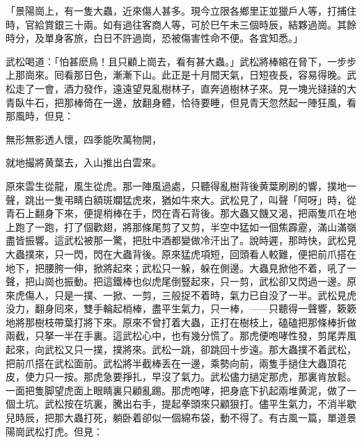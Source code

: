 \begin{myquote}[\markfont]
「景陽崗上，有一隻大蟲，近來傷人甚多。現今立限各鄉里正並獵戶人等，打捕住時，官給賞銀三十兩。如有過往客商人等，可於巳午未三個時辰，結夥過崗。其餘時分，及單身客旅，白日不許過崗，恐被傷害性命不便。各宜知悉。」
\end{myquote}

武松喝道：「怕甚麽鳥！且只顧上崗去，看有甚大蟲。」武松將棒綰在脅下，一步步上那崗來。囘看那日色，漸漸下山。此正是十月間天氣，日短夜長，容易得晚。武松走了一會，酒力發作，遠遠望見亂樹林子，直奔過樹林子來。見一塊光撻撻的大青臥牛石，把那棒倚在一邊，放翻身體，恰待要睡，但見青天忽然起一陣狂風，看那風時，但見：

\begin{myquote}
無形無影透人懷，四季能吹萬物開，

就地撮將黄葉去，入山推出白雲來。
\end{myquote}

原來雲生從龍，風生從虎。那一陣風過處，只聽得亂樹背後黄葉刷刷的響，撲地一聲，跳出一隻弔睛白額斑斕猛虎來，猶如牛來大。武松見了，叫聲「阿呀」時，從青石上翻身下來，便提梢棒在手，閃在青石背後。那大蟲又饑又渴，把兩隻爪在地上跑了一跑，打了個歡翅，將那條尾剪了又剪，半空中猛如一個焦霹靂，滿山滿嶺盡皆振響。這武松被那一驚，把肚中酒都變做冷汗出了。說時遲，那時快，武松見大蟲撲來，只一閃，閃在大蟲背後。原來猛虎項短，回頭看人較難，便把前爪搭在地下，把腰胯一伸，掀將起來；武松只一躲，躲在側邊。大蟲見掀他不着，吼了一聲，把山崗也振動。把這鐵棒也似虎尾倒豎起來，只一剪，武松卻又閃過一邊。原來虎傷人，只是一撲、一掀、一剪，三般捉不着時，氣力已自没了一半。武松見虎没力，翻身囘來，雙手輪起梢棒，盡平生氣力，只一棒，——只聽得一聲響，簌簌地將那樹枝帶葉打將下來。原來不曾打着大蟲，正打在樹枝上，磕磕把那條棒折做兩截，只拏一半在手裏。這武松心中，也有幾分慌了。那虎便咆哮性發，剪尾弄風起來，向武松又只一撲，撲將來。武松一跳，卻跳回十步遠。那大蟲撲不着武松，把前爪搭在武松面前。武松將半截棒丢在一邊，乘勢向前，兩隻手撾住大蟲頂花皮，使力只一按。那虎急要掙扎，早沒了氣力。武松儘力撾定那虎，那裏肯放鬆。一面把隻脚望虎面上眼睛裏只顧亂踢。那虎咆哮，把身底下扒起兩堆黄泥，做了一個土坑。武松按在坑裏，騰出右手，提起拳頭來只顧狠打。儘平生氣力，不消半歇兒時辰，把那大蟲打死，躺卧着卻似一個綿布袋，動不得了。有古風一篇，單道景陽崗武松打虎。但見：


